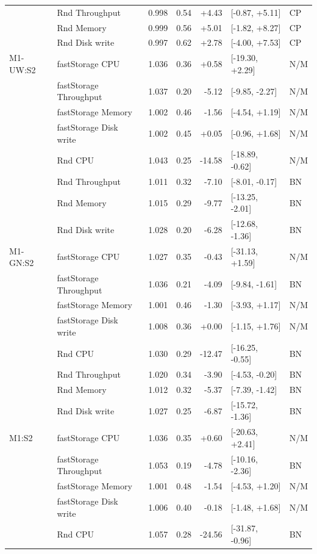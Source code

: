\documentclass[a4paper,11pt]{article}
\begin{document}
\begin{longtable}{@{}llrrrll@{}}
 & Rnd Throughput & 0.998 & 0.54 & +4.43 & [-0.87, +5.11] & CP \\
 & Rnd Memory & 0.999 & 0.56 & +5.01 & [-1.82, +8.27] & CP \\
 & Rnd Disk write & 0.997 & 0.62 & +2.78 & [-4.00, +7.53] & CP \\
\addlinespace
M1-UW:S2 & fastStorage CPU & 1.036 & 0.36 & +0.58 & [-19.30, +2.29] & N/M \\
 & fastStorage Throughput & 1.037 & 0.20 & -5.12 & [-9.85, -2.27] & N/M \\
 & fastStorage Memory & 1.002 & 0.46 & -1.56 & [-4.54, +1.19] & N/M \\
 & fastStorage Disk write & 1.002 & 0.45 & +0.05 & [-0.96, +1.68] & N/M \\
 & Rnd CPU & 1.043 & 0.25 & -14.58 & [-18.89, -0.62] & N/M \\
 & Rnd Throughput & 1.011 & 0.32 & -7.10 & [-8.01, -0.17] & BN \\
 & Rnd Memory & 1.015 & 0.29 & -9.77 & [-13.25, -2.01] & BN \\
 & Rnd Disk write & 1.028 & 0.20 & -6.28 & [-12.68, -1.36] & BN \\
\addlinespace
M1-GN:S2 & fastStorage CPU & 1.027 & 0.35 & -0.43 & [-31.13, +1.59] & N/M \\
 & fastStorage Throughput & 1.036 & 0.21 & -4.09 & [-9.84, -1.61] & BN \\
 & fastStorage Memory & 1.001 & 0.46 & -1.30 & [-3.93, +1.17] & N/M \\
 & fastStorage Disk write & 1.008 & 0.36 & +0.00 & [-1.15, +1.76] & N/M \\
 & Rnd CPU & 1.030 & 0.29 & -12.47 & [-16.25, -0.55] & BN \\
 & Rnd Throughput & 1.020 & 0.34 & -3.90 & [-4.53, -0.20] & BN \\
 & Rnd Memory & 1.012 & 0.32 & -5.37 & [-7.39, -1.42] & BN \\
 & Rnd Disk write & 1.027 & 0.25 & -6.87 & [-15.72, -1.36] & BN \\
\addlinespace
M1:S2 & fastStorage CPU & 1.036 & 0.35 & +0.60 & [-20.63, +2.41] & N/M \\
 & fastStorage Throughput & 1.053 & 0.19 & -4.78 & [-10.16, -2.36] & BN \\
 & fastStorage Memory & 1.001 & 0.48 & -1.54 & [-4.53, +1.20] & N/M \\
 & fastStorage Disk write & 1.006 & 0.40 & -0.18 & [-1.48, +1.68] & N/M \\
 & Rnd CPU & 1.057 & 0.28 & -24.56 & [-31.87, -0.96] & BN \\

\end{longtable}
\end{document}
